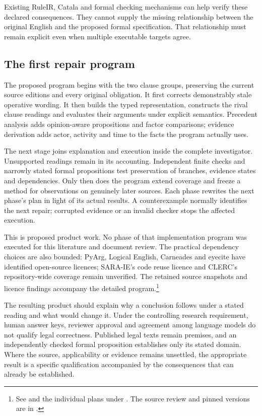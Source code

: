 Existing RuleIR, Catala and formal checking mechanisms can help verify these
declared consequences. They cannot supply the missing relationship between
the original English and the proposed formal specification. That relationship
must remain explicit even when multiple executable targets agree.

\subsection{The first repair program}

The proposed program begins with the two clause groups, preserving the
current source editions and every original obligation. It first corrects
demonstrably stale operative wording. It then builds the typed representation,
constructs the rival clause readings and evaluates their arguments under
explicit semantics. Precedent analysis adds opinion-aware propositions and
factor comparisons; evidence derivation adds actor, activity and time to the
facts the program actually uses.

The next stage joins explanation and execution inside the complete
investigator. Unsupported readings remain in its accounting. Independent
finite checks and narrowly stated formal propositions test preservation of
branches, evidence states and dependencies. Only then does the program extend
coverage and freeze a method for observations on genuinely later sources.
Each phase rewrites the next phase's plan in light of its actual results.
A counterexample normally identifies the next repair; corrupted evidence or
an invalid checker stops the affected execution.

This is proposed product work. No phase of that implementation program was
executed for this literature and document review. The practical dependency
choices are also bounded: PyArg, Logical English, Carneades and eyecite have
identified open-source licences; SARA-IE's code reuse licence and CLERC's
repository-wide coverage remain unverified. The retained source snapshots and
licence findings accompany the detailed program.\footnote{See
 and the individual
plans under . The source review
and pinned versions are in
.}

The resulting product should explain why a conclusion follows under a stated
reading and what would change it. Under the controlling research requirement,
human answer keys, reviewer approval and agreement among language models do
not qualify legal correctness. Published legal texts remain premises, and an
independently checked formal proposition establishes only its stated domain.
Where the source, applicability or evidence remains unsettled, the appropriate
result is a specific qualification accompanied by the consequences that can
already be established.
